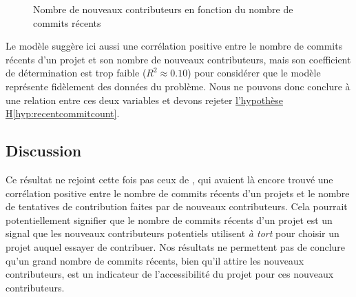\begin{figure}[ht]
    

    

    \caption{Nombre de nouveaux contributeurs en fonction du nombre de \glspl{commit} récents}
    \label{fig:commitCount}
\end{figure}

Le modèle suggère ici aussi une corrélation positive entre le nombre de \glspl{commit} récents d'un projet et
son nombre de nouveaux contributeurs, mais son coefficient de détermination est trop faible ($R^2 \approx
0.10$) pour considérer que le modèle représente fidèlement des données du problème. Nous ne pouvons donc
conclure à une relation entre ces deux variables et devons rejeter
\hyperref[hyp:recentcommitcount]{l'hypothèse H\ref*{hyp:recentcommitcount}}.

\subsection{Discussion}

Ce résultat ne rejoint cette fois pas ceux de \textcite[p.~13,16]{signals-2019}, qui avaient là encore trouvé
une corrélation positive entre le nombre de \glspl{commit} récents d'un projets et le nombre de tentatives de
contribution faites par de nouveaux contributeurs. Cela pourrait potentiellement signifier que le nombre de
\glspl{commit} récents d'un projet est un signal que les nouveaux contributeurs potentiels utilisent \emph{à
tort} pour choisir un projet auquel essayer de contribuer. Nos résultats ne permettent pas de conclure qu'un
grand nombre de \glspl{commit} récents, bien qu'il attire les nouveaux contributeurs, est un indicateur de
l'accessibilité du projet pour ces nouveaux contributeurs.
